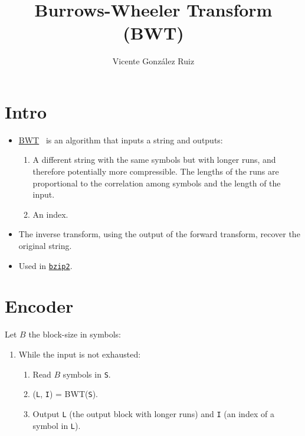 
\title{Burrows-Wheeler Transform (BWT)}

\author{Vicente González Ruiz}

\maketitle

\section{Intro}
\begin{itemize}
\item \href{https://scholar.google.es/scholar?hl=es\&as_sdt=0\%2C5\&q=Burrows+M\%2C+Wheeler+DJ\%3A+A+Block+Sorting+Lossless+Data+Compression+Algorithm.\&btnG=}{BWT}~\cite{burrows1994block} is an algorithm that inputs a string and outputs:

  \begin{enumerate}
  \tightlist
  \item
    A different string with the same symbols but with longer runs, and
    therefore potentially more compressible. The lengths of the runs
    are proportional to the correlation among symbols and the length
    of the input.
  \item
    An index.
  \end{enumerate}
\item
  The inverse transform, using the output of the forward transform,
  recover the original string.
\item
  Used in \href{https://en.wikipedia.org/wiki/Bzip2}{\texttt{bzip2}}.
\end{itemize}

\section{Encoder}\label{encoder}

Let \(B\) the block-size in symbols:

\begin{enumerate}
\tightlist
\item
  While the input is not exhausted:
  \begin{enumerate}
  \tightlist
  \item
    Read \(B\) symbols in \texttt{S}.
  \item
    (\texttt{L}, \texttt{I}) = BWT(\texttt{S}).
  \item
    Output \texttt{L} (the output block with longer runs) and \texttt{I}
    (an index of a symbol in \texttt{L}).
  \end{enumerate}
\end{enumerate}

